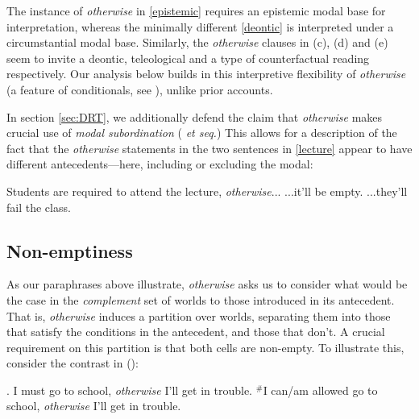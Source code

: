 The instance of \textit{otherwise} in \ref{epistemic} requires an epistemic modal base for interpretation, whereas the minimally different \ref{deontic} is  interpreted under a circumstantial modal base. Similarly, the \textit{otherwise} clauses in (c), (d) and (e) seem to invite a deontic, teleological and a type of counterfactual reading respectively. %
Our analysis below builds in this interpretive flexibility of \textit{otherwise} (a feature of conditionals, see \citealp[65\textit{ff}]{Kratzer2012}), unlike prior accounts. 

In section \ref{sec:DRT}, we additionally defend the claim that \textit{otherwise} makes crucial use of \textit{modal subordination} (\citealt{Roberts1989} \textit{et seq.}) This allows for a description of the fact that the \textit{otherwise} statements in the two sentences in \ref{lecture} appear to have different antecedents---here, including or excluding the modal: 

\pex \label{lecture}  Students are required to attend the lecture, \textit{otherwise}...
\a  {}...it'll be empty.
\a  {}...they'll fail the class. \xe



\subsection{Non-emptiness} \label{sec:non-emptiness}

As our paraphrases above illustrate, \textit{otherwise} asks us to consider what would be the case in the \textit{complement} set of worlds to those introduced in its antecedent. That is, \textit{otherwise} induces a partition over worlds, separating them into those that satisfy the conditions in the antecedent, and those that don't. A crucial requirement on this partition is that both cells are non-empty. To illustrate this, consider the contrast in (\nextx):


\pex \label{school}\a. \label{school-nec} I must go to school, \textit{otherwise} I'll get in trouble.
\a  \label{school-poss} $ ^{\#} $I can/am allowed go to school,  \textit{otherwise} I'll get in trouble.\xe


